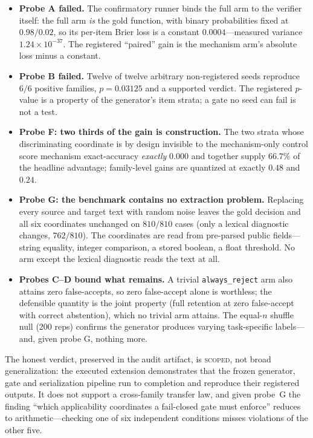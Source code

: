\begin{itemize}[leftmargin=*]
\item \textbf{Probe A failed.} The confirmatory runner binds the full arm to the verifier itself: the full arm \emph{is} the gold function, with binary probabilities fixed at $0.98/0.02$, so its per-item Brier loss is a constant $0.0004$---measured variance $1.24\times10^{-37}$. The registered ``paired'' gain is the mechanism arm's absolute loss minus a constant.
\item \textbf{Probe B failed.} Twelve of twelve arbitrary non-registered seeds reproduce $6/6$ positive families, $p=0.03125$ and a supported verdict. The registered $p$-value is a property of the generator's item strata; a gate no seed can fail is not a test.
\item \textbf{Probe F: two thirds of the gain is construction.} The two strata whose discriminating coordinate is by design invisible to the mechanism-only control score mechanism exact-accuracy \emph{exactly} $0.000$ and together supply $66.7\%$ of the headline advantage; family-level gains are quantized at exactly $0.48$ and $0.24$.
\item \textbf{Probe G: the benchmark contains no extraction problem.} Replacing every source and target text with random noise leaves the gold decision and all six coordinates unchanged on $810/810$ cases (only a lexical diagnostic changes, $762/810$). The coordinates are read from pre-parsed public fields---string equality, integer comparison, a stored boolean, a float threshold. No arm except the lexical diagnostic reads the text at all.
\item \textbf{Probes C--D bound what remains.} A trivial \texttt{always\_reject} arm also attains zero false-accepts, so zero false-accept alone is worthless; the defensible quantity is the joint property (full retention at zero false-accept with correct abstention), which no trivial arm attains. The equal-$n$ shuffle null (200 reps) confirms the generator produces varying task-specific labels---and, given probe G, nothing more.
\end{itemize}

The honest verdict, preserved in the audit artifact, is \textsc{scoped}, not broad generalization: the executed extension demonstrates that the frozen generator, gate and serialization pipeline run to completion and reproduce their registered outputs. It does not support a cross-family transfer law, and given probe~G the finding ``which applicability coordinates a fail-closed gate must enforce'' reduces to arithmetic---checking one of six independent conditions misses violations of the other five.

